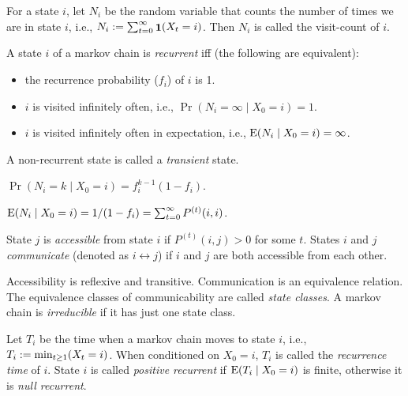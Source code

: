 \documentclass[a4paper, 12pt, fleqn]{article}
\DeclareMathOperator{\boolone}{\mathbf{1}}
\begin{document}
\begin{definition}
For a state $i$, let $N_i$ be the random variable that counts the number of times
we are in state $i$, i.e., $N_i \defeq \sum_{t=0}^{\infty}\boolone(X_t = i)$.
Then $N_i$ is called the visit-count of $i$.
\end{definition}

\begin{definition}
\label{defn:recurrence}
A state $i$ of a markov chain is \emph{recurrent} iff (the following are equivalent):
\begin{itemize}
\item the recurrence probability ($f_i$) of $i$ is 1.
\item $i$ is visited infinitely often, i.e., $\Pr(N_i=\infty \mid X_0 = i) = 1$.
\item $i$ is visited infinitely often in expectation, i.e., $\operatorname*{E}(N_i \mid X_0 = i) = \infty$.
\end{itemize}
A non-recurrent state is called a \emph{transient} state.
\end{definition}

\begin{lemma}
\label{thm:recurrence}
$\Pr(N_i = k \mid X_0 = i) = f_i^{k-1}(1-f_i)$.
\end{lemma}

\begin{lemma}
$\operatorname*{E}(N_i \mid X_0 = i) = 1/(1-f_i) = \sum_{t=0}^{\infty}P^{(t)}(i,i)$.
\end{lemma}

\begin{definition}
State $j$ is \emph{accessible} from state $i$ if $P^{(t)}(i, j) > 0$ for some $t$.
States $i$ and $j$ \emph{communicate} (denoted as $i \leftrightarrow j$)
if $i$ and $j$ are both accessible from each other.
\end{definition}

\begin{lemma}
Accessibility is reflexive and transitive.
Communication is an equivalence relation.
The equivalence classes of communicability are called \emph{state classes}.
A markov chain is \emph{irreducible} if it has just one state class.
\end{lemma}

\begin{definition}
Let $T_i$ be the time when a markov chain moves to state $i$, i.e.,
$T_i := \min_{t \ge 1} (X_t = i)$.
When conditioned on $X_0 = i$, $T_i$ is called the \emph{recurrence time} of $i$.
State $i$ is called \emph{positive recurrent} if $\operatorname*{E}(T_i \mid X_0=i)$ is finite,
otherwise it is \emph{null recurrent}.
\end{definition}
\end{document}
